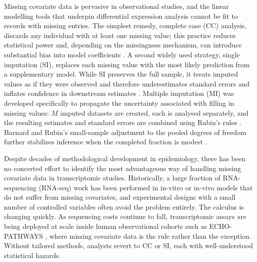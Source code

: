 \documentclass[11pt]{article}
\begin{document}
Missing covariate data is pervasive in observational studies, and the linear modelling tools that underpin differential expression analysis cannot be fit to records with missing entries. The simplest remedy, complete case (CC) analysis, discards any individual with at least one missing value; this practice reduces statistical power and, depending on the missingness mechanism, can introduce substantial bias into model coefficients \citep{sterne2009multiple,little2019statistical}. A second widely used strategy, single imputation (SI), replaces each missing value with the most likely prediction from a supplementary model. While SI preserves the full sample, it treats imputed values as if they were observed and therefore underestimates standard errors and inflates confidence in downstream estimates \citep{rubin1987multiple,sterne2009multiple}. Multiple imputation (MI) was developed specifically to propagate the uncertainty associated with filling in missing values: $M$ imputed datasets are created, each is analysed separately, and the resulting estimates and standard errors are combined using Rubin's rules \citep{rubin1987multiple,marshall2009combining}. Barnard and Rubin's small-sample adjustment to the pooled degrees of freedom further stabilises inference when the completed fraction is modest \citep{barnard1999smalls}.

Despite decades of methodological development in epidemiology, there has been no concerted effort to identify the most advantageous way of handling missing covariate data in transcriptomic studies. Historically, a large fraction of RNA-sequencing (RNA-seq) work has been performed in in-vitro or in-vivo models that do not suffer from missing covariates, and experimental designs with a small number of controlled variables often avoid the problem entirely. The calculus is changing quickly. As sequencing costs continue to fall, transcriptomic assays are being deployed at scale inside human observational cohorts such as ECHO-PATHWAYS \citep{paulson2022lewinn,paquette2023placental}, where missing covariate data is the rule rather than the exception. Without tailored methods, analysts revert to CC or SI, each with well-understood statistical hazards.
\end{document}
